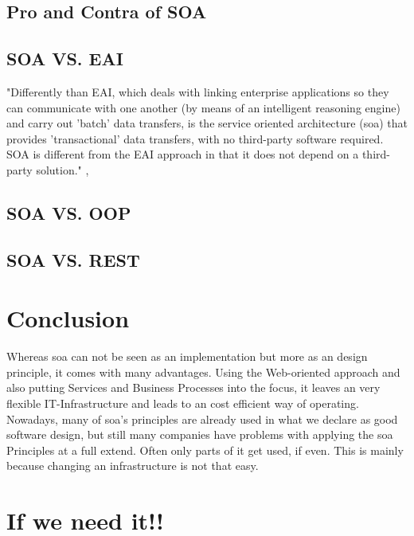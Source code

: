 \documentclass[12pt]{article}
\begin{document}
\subsection{Pro and Contra of SOA}
\subsection{SOA VS. EAI}
"Differently than EAI, which deals with linking enterprise applications so they can communicate with one another (by means of an intelligent reasoning engine) and carry out 'batch' data transfers, is the service oriented architecture (\gls{soa}) that provides 'transactional' data transfers, with no third-party software required. SOA is different from the EAI approach in that it does not depend on a third-party solution." ,\cite{soadef}
\begin{figure}[here!]
	\centering
	\label{fig:eaipartofso}
	\end{figure}
\subsection{SOA VS. OOP}
\subsection{SOA VS. REST}



\section{Conclusion}
Whereas \gls{soa} can not be seen as an implementation but more as an design principle, it comes with many advantages. Using the Web-oriented approach and also putting Services and Business Processes into the focus, it leaves an very flexible IT-Infrastructure and leads to an cost efficient way of operating.\\
Nowadays, many of \gls{soa}'s principles are already used in what we declare as good software design, but still many companies have problems with applying the \gls{soa} Principles at a full extend. Often only parts of it get used, if even. This is mainly because changing an infrastructure is not that easy. \\


\section{If we need it!!}
\end{document}
